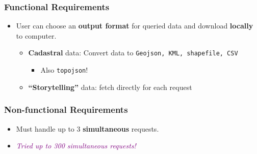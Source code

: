 \documentclass[xcolor=table]{beamer}
\begin{document}
\begin{frame}
	\frametitle{Functional Requirements}
	\begin{itemize}
		\item User can choose an \textbf{output format} for queried data and 
		download \textbf{locally} to computer. 
		\begin{itemize}
			\item \textbf{Cadastral} data: Convert data to \texttt{Geojson, 
			KML, shapefile, CSV}
			\begin{itemize}
				\item<2-> Also \texttt{topojson}! %
			\end{itemize}
			\item \textbf{``Storytelling''} data: fetch directly for each 
			request
		\end{itemize}
	\end{itemize}
\end{frame}

\begin{frame}
	\frametitle{Non-functional Requirements}
	\begin{itemize}
		\item Must handle up to 3 \textbf{simultaneous} requests. \\ 
		\item <2-> \textcolor{purple}{\textit{Tried up to 300 
		simultaneous requests!}}
	\end{itemize}
\end{frame}
\end{document}
